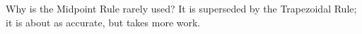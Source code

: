 {Why is the Midpoint Rule rarely used?}
{It is superseded by the Trapezoidal Rule; it is about as accurate, but takes more work.}
